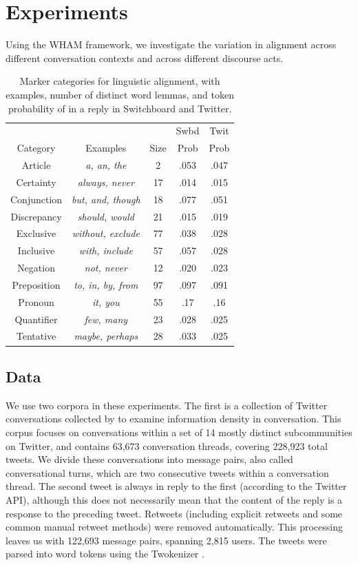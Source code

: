 \documentclass[11pt]{article}
\begin{document}
\section{Experiments}

Using the WHAM framework, we investigate the variation in alignment across different conversation contexts and across different discourse acts.

\begin{table}
\centering
\small
\begin{tabular}{|c|c|c|c|c|} \hline
& & & Swbd & Twit \\
Category & Examples & Size & Prob & Prob\\ \hline
Article & \textit{a, an, the} & 2 & .053 & .047\\
Certainty  & \textit{always, never} & 17 & .014 & .015\\
Conjunction  & \textit{but, and, though} & 18 & .077 & .051\\
Discrepancy  & \textit{should, would} & 21 & .015 & .019\\
Exclusive  & \textit{without, exclude} & 77 & .038 & .028\\
Inclusive  & \textit{with, include} & 57 & .057 & .028\\
Negation  & \textit{not, never} & 12 & .020 & .023\\
Preposition  & \textit{to, in, by, from} & 97 & .097 & .091\\
Pronoun   & \textit{it, you} & 55 & .17 & .16\\
Quantifier  & \textit{few, many} & 23 & .028 & .025\\
Tentative & \textit{maybe, perhaps} & 28 & .033 & .025\\
\hline\end{tabular}
\caption{Marker categories for linguistic alignment, with examples, number of distinct word lemmas, and token probability of in a reply in Switchboard and Twitter.}\label{tab:LIWC}
\end{table}

\subsection{Data}
We use two corpora in these experiments. The first is a collection of Twitter conversations collected by \cite{DoyleFrank2015CMCL} to examine information density in conversation. This corpus focuses on conversations within a set of 14 mostly distinct subcommunities on Twitter, and contains 63,673 conversation threads, covering 228,923 total tweets.  We divide these conversations into message pairs, also called conversational turns, which are two consecutive tweets within a conversation thread.  The second tweet is always in reply to the first (according to the Twitter API), although this does not necessarily mean that the content of the reply is a response to the preceding tweet. Retweets (including explicit retweets and some common manual retweet methods) were removed automatically. This processing leaves us with 122,693 message pairs, spanning 2,815 users.  The tweets were parsed into word tokens using the Twokenizer \cite{OwoputiEtAl2013}.
\end{document}
